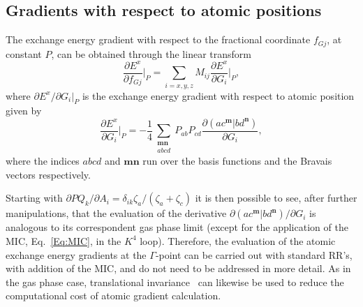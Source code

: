 \documentclass[prl,preprint,doublespace]{revtex4} %
\begin{document}
\subsection{Gradients with respect to atomic positions}
The exchange energy gradient with respect to the fractional coordinate 
$f_{Gj}$, at constant $P$, can be obtained through the linear transform 
\begin{equation*}
 \frac{\partial E^x}{\partial f_{Gj}}\bigg|_P=\sum_{i=x,y,z}M_{ij}\frac{\partial E^x}{\partial G_i}\bigg|_P,
\end{equation*}
where $\partial E^x/\partial G_i|_P$ is the exchange energy gradient with respect to atomic position given by
\begin{equation}\label{Eq:Grad}
  \frac{\partial E^x}{\partial G_i}\bigg|_P =
  -\frac{1}{4}\sum_{\substack{\mathbf{m}\mathbf{n}\\a b c d}}P_{ab}P_{cd}
  \frac{\partial(ac^\mathbf{m}|bd^\mathbf{n})}{\partial G_i},
\end{equation}
where the indices $abcd$ and $\mathbf{mn}$ run over the basis functions and the
Bravais vectors respectively.

Starting with $\partial PQ_k/\partial A_i=\delta_{ik}\zeta_a/(\zeta_a+\zeta_c)$
it is then possible to see, after further manipulations, 
that the evaluation of the derivative $\partial(ac^\mathbf{m}|bd^\mathbf{n})/\partial G_i$
is analogous to its correspondent gas phase
limit (except for the application of the MIC, Eq.~\ref{Eq:MIC}, in the $K^4$ loop). 
Therefore, the evaluation of the atomic exchange energy gradients at the $\Gamma$-point
can be carried out with standard RR's, with addition of the MIC, and do not need to be addressed in more 
detail. As in the gas phase case, translational 
invariance~\cite{AKorminicki77} can likewise be used to reduce the 
computational cost of atomic gradient calculation.
\end{document}
